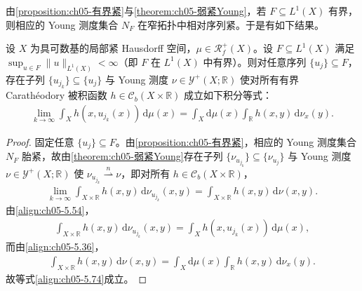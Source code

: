 \documentclass[../../main.tex]{subfiles}%
\begin{document}
由\cref{proposition:ch05-有界紧}与\cref{theorem:ch05-弱紧Young}，若 $F\subseteq L^1(X)$ 有界，则相应的 Young 测度集合 $N_F$ 在窄拓扑中相对序列紧。于是有如下结果。

\begin{theorem}\label{theorem:ch05-函数窄收敛}
设 $X$ 为具可数基的局部紧 Hausdorff 空间，$\mu\in\mathscr{R}^+_f(X)$。设 $F\subseteq L^1(X)$ 满足 $\sup_{u\in F}\|u\|_{L^1(X)}<\infty$（即 $F$ 在 $L^1(X)$ 中有界）。则对任意序列 $\{u_j\}\subseteq F$，存在子列 $\{u_{j_k}\}\subseteq\{u_j\}$ 与 Young 测度 $\nu\in\mathcal{Y}^+(X;\mathbb{R})$ 使对所有有界 Carathéodory 被积函数 $h\in\mathcal{C}_b(X\times\mathbb{R})$ 成立如下积分等式：
\begin{align}
\lim_{k\to\infty}\int_Xh(x,u_{j_k}(x))\,\mathrm{d}\mu(x)
=\int_X\mathrm{d}\mu(x)\int_{\mathbb{R}}h(x,y)\,\mathrm{d}\nu_x(y).\label{align:ch05-5.74}
\end{align}
\end{theorem}

\begin{proof}
固定任意 $\{u_j\}\subseteq F$。由\cref{proposition:ch05-有界紧}，相应的 Young 测度集合 $N_F$ 胎紧，故由\cref{theorem:ch05-弱紧Young}存在子列 $\{\nu_{u_{j_k}}\}\subseteq\{\nu_{u_j}\}$ 与 Young 测度 $\nu\in\mathcal{Y}^+(X;\mathbb{R})$ 使 $\nu_{u_{j_k}}\stackrel{n}{\rightharpoonup}\nu$，即对所有 $h\in\mathcal{C}_b(X\times\mathbb{R})$，
\begin{align*}
\lim_{k\to\infty}\int_{X\times\mathbb{R}}h(x,y)\,\mathrm{d}\nu_{u_{j_k}}(x,y)
=\int_{X\times\mathbb{R}}h(x,y)\,\mathrm{d}\nu(x,y).
\end{align*}
由\eqref{align:ch05-5.54}，
\begin{align*}
\int_{X\times\mathbb{R}}h(x,y)\,\mathrm{d}\nu_{u_{j_k}}(x,y)
=\int_Xh(x,u_{j_k}(x))\,\mathrm{d}\mu(x),
\end{align*}
而由\eqref{align:ch05-5.36}，
\begin{align*}
\int_{X\times\mathbb{R}}h(x,y)\,\mathrm{d}\nu(x,y)
=\int_X\mathrm{d}\mu(x)\int_{\mathbb{R}}h(x,y)\,\mathrm{d}\nu_x(y).
\end{align*}
故等式\eqref{align:ch05-5.74}成立。
\end{proof}
\end{document}
